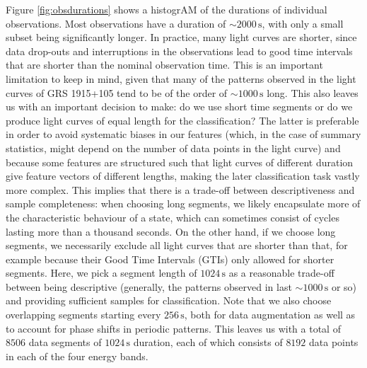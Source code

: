 \documentclass[12pt]{emulateapj}
\begin{document}
Figure \ref{fig:obsdurations} shows a histogrAM of the durations of individual observations. Most observations have a duration of $\sim\!2000 \,\mathrm{s}$, with only a small subset being significantly longer.
In practice, many light curves are shorter, since data drop-outs and interruptions in the observations lead to good time intervals that are shorter than the nominal observation time. This is an important limitation to keep in mind, given that many of the patterns observed in the light curves of GRS 1915+105 tend to be of the order of $\sim\! 1000 \,\mathrm{s}$ long.  This also leaves us with an important decision to make: do we use short time segments or do we produce light curves of equal length for the classification? The latter is preferable in order to avoid systematic biases in our features (which, in the case of summary statistics, might depend on the number of data points in the light curve) and because some features are structured such that light curves of different duration give feature vectors of different lengths, making the later classification task vastly more complex. This implies that there is a trade-off between descriptiveness and sample completeness: when choosing long segments, we likely encapsulate more of the characteristic behaviour of a state, which can sometimes consist of cycles lasting more than a thousand seconds. On the other hand, if we choose long segments, we necessarily exclude all light curves that are shorter than that, for example because their Good Time Intervals (GTIs) only allowed for shorter segments. Here, we pick a segment length of $1024\,\mathrm{s}$ as a reasonable trade-off between being descriptive (generally, the patterns observed in \citet{belloni2000} last $\sim\!1000\,\mathrm{s}$ or so) and providing sufficient samples for classification. Note that we also choose overlapping segments starting every $256\,\mathrm{s}$, both for data augmentation as well as to account for phase shifts in periodic patterns. This leaves us with a total of $8506$ data segments of $1024\,\mathrm{s}$ duration, each of which consists of $8192$ data points in each of the four energy bands.


%
\end{document}

